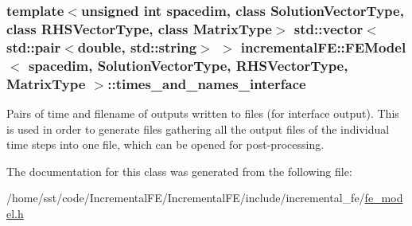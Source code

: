 \subsubsection[{\texorpdfstring{times\+\_\+and\+\_\+names\+\_\+interface}{times_and_names_interface}}]{\setlength{\rightskip}{0pt plus 5cm}template$<$unsigned int spacedim, class Solution\+Vector\+Type, class R\+H\+S\+Vector\+Type, class Matrix\+Type$>$ std\+::vector$<$ std\+::pair$<$double, std\+::string$>$ $>$ {\bf incremental\+F\+E\+::\+F\+E\+Model}$<$ spacedim, Solution\+Vector\+Type, R\+H\+S\+Vector\+Type, Matrix\+Type $>$\+::times\+\_\+and\+\_\+names\+\_\+interface\hspace{0.3cm}{\ttfamily [private]}}\hypertarget{classincremental_f_e_1_1_f_e_model_aaa0e0ef1be909224dfe6f28484b9d754}{}\label{classincremental_f_e_1_1_f_e_model_aaa0e0ef1be909224dfe6f28484b9d754}
Pairs of time and filename of outputs written to files (for interface output). This is used in order to generate files gathering all the output files of the individual time steps into one file, which can be opened for post-\/processing. 

The documentation for this class was generated from the following file\+:\begin{DoxyCompactItemize}
\item 
/home/sst/code/\+Incremental\+F\+E/\+Incremental\+F\+E/include/incremental\+\_\+fe/\hyperlink{fe__model_8h}{fe\+\_\+model.\+h}\end{DoxyCompactItemize}
